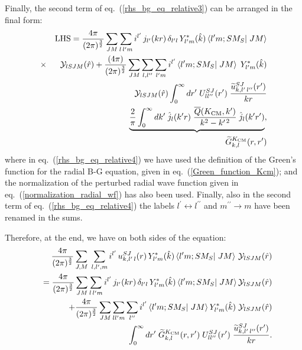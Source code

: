 \documentclass[aps,twocolumn,showpacs,preprintnumbers,amsmath,amssymb,nofootinbib,superscriptaddress,showkeys,noeprint]{revtex4-1}
\begin{document}
Finally, the second term of eq.~(\ref{rhs_bg_eq_relative3}) can be
arranged in the final form:
\begin{eqnarray}
  &&{\rm LHS}=\frac{4\pi}{(2\pi)^\frac32}
 \sum_{JM}\sum_{l\,l^\prime m}
 i^{l^\prime}\,
 j_{l^\prime}(kr)\,
 \delta_{l^\prime l}\,
 Y^*_{l^\prime m}(\hat{k}) \left\langle
 l^\prime m;SM_S\right|
 \left. JM\right\rangle
 \nonumber\\
&\times& \mathcal{Y}_{lSJM}(\hat{r})+
\frac{(4\pi)}{(2\pi)^\frac32}
\sum_{JM}
\sum_{l,l^{\prime\prime}}
\sum_{l^{\prime}m}
i^{l^{\prime}}
\left\langle l^{\prime}m;SM_S
\right|\left. JM
\right\rangle\;
Y^*_{l^{\prime}m}(\hat{k})\nonumber\\
&&\mathcal{Y}_{l S J M}(\hat{r})
\int^\infty_0 dr^\prime\;
U^{SJ}_{l l^{\prime\prime}}(r^\prime)\;
\frac{\widetilde{u}^{SJ}_{k,l^{\prime}\,l^{\prime\prime}}(r^\prime)}{kr}
\nonumber\\
&&\underbrace{\frac{2}{\pi}\int^\infty_0 dk^\prime\;
\hat{j}_{l}(k^\prime r)\;
\frac{\overline{Q}(K_{\rm CM},k^\prime)}{k^2-k^{\prime\,2}}\;
\hat{j}_l(k^\prime
r^\prime)},
\label{rhs_bg_eq_relative4}\\
&&\qquad\qquad\qquad\quad \widetilde{G}^{K_{\rm CM}}_{k,l}(r,r^\prime)\nonumber
\end{eqnarray}
where in eq.~(\ref{rhs_bg_eq_relative4}) we have used the definition
of the Green's function for the radial B-G equation, given in
eq.~(\ref{Green_function_Kcm}); and the normalization of the perturbed
radial wave function given in eq.~(\ref{normalization_radial_wf}) has
also been used. Finally, also in the second term of
eq.~(\ref{rhs_bg_eq_relative4}) the labels $l^\prime \leftrightarrow
l^{\prime\prime}$ and $m^{\prime\prime}\rightarrow m$ have been
renamed in the sums.

Therefore, at the end, we have on both sides of the equation:
\begin{eqnarray}
 &&\frac{4\pi}{(2\pi)^{\frac32}}\sum_{J,M}\; 
\sum_{l,l^\prime,m} 
i^{l^\prime}\, 
u^{SJ}_{k,l^\prime\,l}(r)\, 
Y^*_{l^\prime m}(\hat{k})
\left\langle l^\prime m; S M_S\right| \left. J M \right\rangle\,
\mathcal{Y}_{l S J M} (\hat{r})\nonumber\\
&&=\frac{4\pi}{(2\pi)^\frac32}
 \sum_{JM}\sum_{l\,l^\prime m}
 i^{l^\prime}\,
 j_{l^\prime}(kr)\,
 \delta_{l^\prime l}\,
 Y^*_{l^\prime m}(\hat{k}) \left\langle
 l^\prime m;SM_S\right|
 \left. JM\right\rangle
\mathcal{Y}_{lSJM}(\hat{r})\nonumber\\
&&+\frac{4\pi}{(2\pi)^\frac32}
\sum_{JM}
\sum_{l l^{\prime}m}
\sum_{l^{\prime\prime}}
i^{l^{\prime}}
\left\langle l^{\prime}m;SM_S
\right|\left. JM
\right\rangle
Y^*_{l^{\prime}m}(\hat{k})\;\mathcal{Y}_{l S J M}(\hat{r})
\nonumber\\
&&\int^\infty_0 dr^\prime\; \widetilde{G}^{K_{\rm CM}}_{k,l}(r,r^\prime)\;
U^{SJ}_{l l^{\prime\prime}}(r^\prime)\;
\frac{\widetilde{u}^{SJ}_{k,l^{\prime}\,l^{\prime\prime}}(r^\prime)}{kr}.\label{two_sides_bg_eq}
\end{eqnarray}
\end{document}
